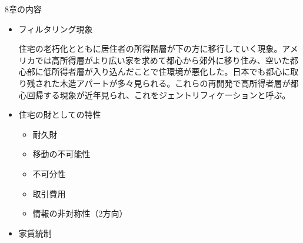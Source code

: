 \documentclass{jsarticle}
\begin{document}
8章の内容
\begin{itemize}
\item フィルタリング現象

住宅の老朽化とともに居住者の所得階層が下の方に移行していく現象。アメリカでは高所得層がより広い家を求めて都心から郊外に移り住み、空いた都心部に低所得者層が入り込んだことで住環境が悪化した。日本でも都心に取り残された木造アパートが多々見られる。これらの再開発で高所得者層が都心回帰する現象が近年見られ、これをジェントリフィケーションと呼ぶ。
\item 住宅の財としての特性
	\begin{itemize}
	\item 耐久財
	\item 移動の不可能性
	\item 不可分性
	\item 取引費用
	\item 情報の非対称性（2方向）
	\end{itemize}
\item 家賃統制
\end{itemize}
\end{document}
